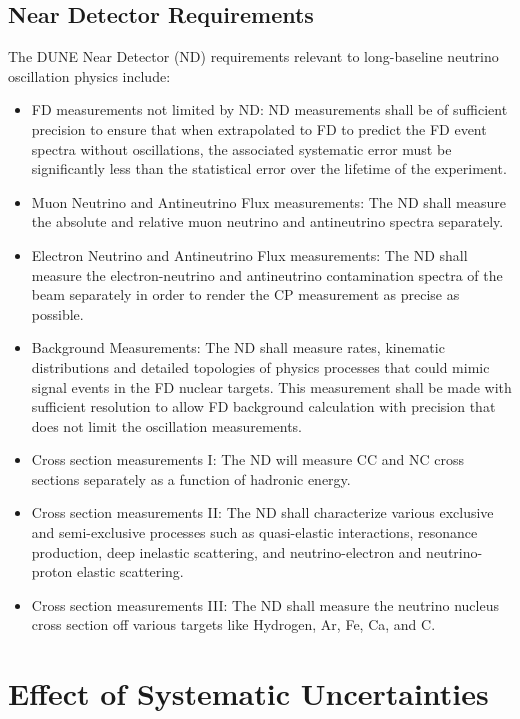 \subsection{Near Detector Requirements}
\label{sec:physics-lbnosc-nd-req}

The DUNE Near Detector (ND) requirements relevant to long-baseline neutrino oscillation physics include:
\begin{itemize}
 \item FD measurements not limited by ND: ND measurements shall be of sufficient precision to ensure that when extrapolated to FD to predict the FD event spectra without oscillations, the associated systematic error must be significantly less than the statistical error over the lifetime of the experiment. 
 \item Muon Neutrino and Antineutrino Flux measurements: The ND shall measure the absolute and relative muon neutrino and antineutrino spectra separately.
 \item Electron Neutrino and Antineutrino Flux measurements: The ND shall measure the electron-neutrino and antineutrino contamination spectra of the beam separately in order to render the CP measurement as precise as possible.
 \item Background Measurements: The ND shall measure rates, kinematic distributions and detailed topologies of physics processes that could mimic signal events in the FD nuclear targets. This measurement shall be made with sufficient resolution to allow FD background calculation with precision that does not limit the oscillation measurements.
 \item Cross section measurements I: The ND will measure CC and NC cross sections separately as a function of hadronic energy.
 \item Cross section measurements II: The ND shall characterize various exclusive and semi-exclusive processes such as quasi-elastic interactions, resonance production, deep inelastic scattering, and neutrino-electron and neutrino-proton elastic scattering.
 \item Cross section measurements III: The ND shall measure the neutrino nucleus cross section off various targets like Hydrogen, Ar, Fe, Ca, and C.
\end{itemize}

\section{Effect of Systematic Uncertainties}
\label{sec:physics-lbnosc-beamnd-req}


